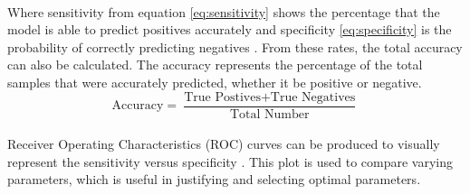 \\
Where sensitivity from equation \ref{eq:sensitivity} shows the percentage that the model is able to predict positives accurately and specificity \ref{eq:specificity} is the probability of correctly predicting negatives \cite{ref:stat_1}. From these rates, the total accuracy can also be calculated. The accuracy represents the percentage of the total samples that were accurately predicted, whether it be positive or negative. 
\\
\begin{equation}
\textrm{Accuracy} = \frac{\textrm{True Postives} + \textrm{True Negatives}}{\textrm{Total Number}}
\end{equation}
\\
Receiver Operating Characteristics (ROC) curves can be produced to visually represent the sensitivity versus specificity \cite{ref:ml_1}. This plot is used to compare varying parameters, which is useful in justifying and selecting optimal parameters.
